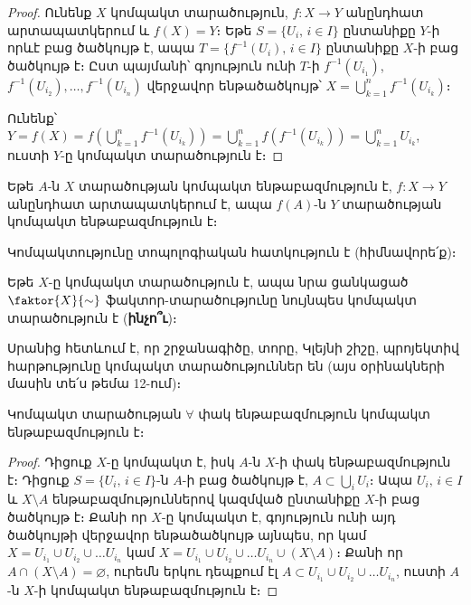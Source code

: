 \documentclass[./main.tex]{subfiles}
\begin{document}
\begin{proof}
Ունենք $X$ կոմպակտ տարածություն, $f:X\rightarrow Y$ անընդհատ արտապատկերում և ${f(X)=Y}$։ Եթե $S=\{U_i,\, i\in I\}$ ընտանիքը $Y$-ի որևէ բաց ծածկույթ է, ապա ${T=\{f^{-1}(U_i),\, i\in I\} }$  ընտանիքը $X$-ի բաց ծածկույթ է։ Ըստ պայ\-մանի՝ գոյություն ունի $T$-ի ${f^{-1}(U_{i_1})}$, ${f^{-1}(U_{i_2}), \dots , f^{-1}(U_{i_n})}$ վերջավոր ենթածած\-կույթ՝ $X=\bigcup\limits_{k=1}^n f^{-1}(U_{i_k})$։

\par Ունենք՝ $Y= f(X)=f\left(\bigcup\limits_{k=1}^n f^{-1}(U_{i_k})\right)=\bigcup\limits_{k=1}^n f(f^{-1}(U_{i_k}))=\bigcup\limits_{k=1}^nU_{i_k}$, ուստի $Y$-ը կոմպակտ տարածություն է։
\end{proof}

\begin{hetevanq_counter}\label{ch16cor1}
Եթե $A$-ն $X$ տարածության կոմպակտ ենթաբազմություն է, ${f:X\rightarrow Y}$ անընդհատ արտապատկերում է, ապա $f(A)$-ն $Y$ տարածության կոմպակտ են\-թա\-բազ\-մու\-թյուն է։
\end{hetevanq_counter} %
\begin{hetevanq_counter}\label{ch16cor2}
Կոմպակտությունը տոպոլոգիական հատկություն է (հիմնավորե՛ք)։
\end{hetevanq_counter} %
\begin{hetevanq_counter}\label{ch16cor3}
Եթե $X$-ը կոմպակտ տարածություն է, ապա նրա ցանկացած $\faktor{X}{\sim}$ ֆակտոր-տարածությունը նույնպես կոմպակտ տարածություն է (\textbf{ինչո՞ւ})։
\end{hetevanq_counter} %

\par Սրանից հետևում է, որ շրջանագիծը, տորը, Կլեյնի շիշը, պրոյեկտիվ հար\-թու\-թ\-յունը կոմպակտ տարածություններ են (այս օրինակների մասին տե՛ս թեմա 12-ում)։

\begin{theorem}\label{ch16thm4}\label{թեորեմ 4}
Կոմպակտ տարածության $\forall$ փակ ենթաբազմություն կոմպակտ \linebreak ենթա\-բազմություն է։
\end{theorem} %

\begin{proof}
Դիցուք $X$-ը կոմպակտ է, իսկ $A$-ն $X$-ի փակ ենթաբազմություն է։ Դիցուք $S=\{ U_i,\, i\in I\} $-ն $A$-ի բաց ծածկույթ է, $A\subset \bigcup\limits_i U_i$։ Ապա $U_i,\, i\in I$ և $X\setminus A$ ենթաբազմություններով կազմված ընտանիքը $X$-ի բաց ծածկույթ է։ Քանի որ $X$-ը կոմպակտ է, գոյություն ունի այդ ծածկույթի վերջավոր ենթածածկույթ այնպես, որ կամ $X=U_{i_1}\cup U_{i_2}\cup \dots U_{i_n}$ կամ $X=U_{i_1}\cup U_{i_2}\cup \dots U_{i_n}\cup(X\setminus A)$։ Քանի որ $A \cap (X \setminus A) = \varnothing$, ուրեմն երկու դեպքում էլ $A\subset U_{i_1}\cup U_{i_2}\cup \dots U_{i_n}$, ուստի $A$-ն $X$-ի կոմպակտ ենթաբազմություն է։
\end{proof}
\end{document}

